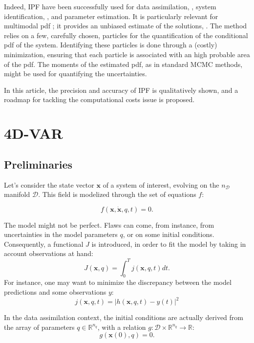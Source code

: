 \documentclass[aip,pof,nofootinbib,reprint,onecolumn]{revtex4-1}
\newcommand{\gras}[1]{\boldsymbol{#1}}
\newcommand{\Ephaz}{\mathcal{D}}%
\newcommand{\Nphaz}{n_{\mathcal{D}}} %
\newcommand{\fdyn}{f} %
\newcommand{\costf}{J} %
\newcommand{\costff}{j} %
\newcommand{\obs}{y} %
\newcommand{\point}{\gras{x}} %
\begin{document}
Indeed, IPF have been successfully used for data assimilation, \cite{Chorin2010}, system identification, \cite{Morzfeld2012}, and parameter estimation. 
It is particularly relevant for multimodal pdf ; it provides an unbiased estimate of the solutions, \citep{Atkins2013}.
The method relies on a few, carefully chosen, particles for the quantification of the conditional pdf of the system. 
Identifying these particles is done through a (costly) minimization, ensuring that each particle is associated with an high probable area of the pdf. 
The moments of the estimated pdf, as in standard MCMC methods, might be used for quantifying the uncertainties.

In this article, the precision and accuracy of IPF is qualitatively shown, and a roadmap for tackling the computational costs issue is proposed.

\section{4D-VAR}
\subsection{Preliminaries}
Let's consider the state vector $\point$ of a system of interest, evolving on the $\Nphaz$ manifold $\Ephaz $. This field is modelized through the set of equations $\fdyn$:

\begin{equation}
\fdyn(\point,\dot{\point},q,t) =0.
\label{eq-system}
\end{equation} 

The model might not be perfect. Flaws can come, from instance, from uncertainties in the model parameters $q$, or on some initial conditions.
Consequently, a functional $\costf$ is introduced, in order to fit the model by taking in account observations at hand:
\begin{equation}
\costf(\point,q) = \int_0^T  \costff(\point,q,t) dt.
\label{eq-def_cost}
\end{equation} 
For instance, one may want to minimize the discrepancy between the model predictions and some observations $\obs$:
$$\costff(\point,q,t) = \left|h(\point,q,t) - \obs(t)\right|^2$$ 

In the data assimilation context, the initial conditions are actually derived from the array of parameters $q\in\mathbb{R}^{n_q}$, with a relation $g:\Ephaz\times\mathbb{R}^{n_q}\rightarrow\mathbb{R}$:
$$g(\point(0),q) = 0.$$
\end{document}
